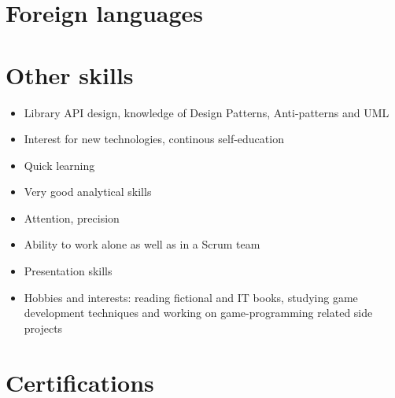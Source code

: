 \documentclass[10pt,a4paper,sans]{moderncv}
\begin{document}
\section{Foreign languages}

\section{Other skills}
\begin{itemize}
	\item Library API design, knowledge of Design Patterns, Anti-patterns and UML
	\item Interest for new technologies, continous self-education
	\item Quick learning
	\item Very good analytical skills
	\item Attention, precision
	\item Ability to work alone as well as in a Scrum team
	\item Presentation skills
	\item Hobbies and interests: reading fictional and IT books, studying game development techniques and working on game-programming related side projects
\end{itemize}

\section{Certifications}
\end{document}
